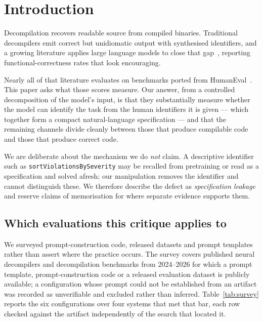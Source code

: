 \documentclass[conference]{IEEEtran}
\begin{document}
\section{Introduction}
Decompilation recovers readable source from compiled binaries. Traditional
decompilers emit correct but unidiomatic output with synthesised identifiers, and
a growing literature applies large language models to close that
gap~\cite{llm4decompile}, reporting functional-correctness rates that look
encouraging.

Nearly all of that literature evaluates on benchmarks ported from
HumanEval~\cite{chen2021evaluating}. This paper asks what those scores measure.
Our answer, from a controlled decomposition of the model's input, is that they
substantially measure whether the model can identify the task from the human
identifiers it is given --- which together form a compact natural-language
specification --- and that the remaining channels divide cleanly between those
that produce compilable code and those that produce correct code.

We are deliberate about the mechanism we do \emph{not} claim. A descriptive
identifier such as \texttt{sortViolationsBySeverity} may be recalled from
pretraining or read as a specification and solved afresh; our manipulation
removes the identifier and cannot distinguish these. We therefore describe the
defect as \emph{specification leakage} and reserve claims of memorisation for
where separate evidence supports them.

\subsection{Which evaluations this critique applies to}
\label{sec:scope}
We surveyed prompt-construction code, released datasets and prompt templates
rather than assert where the practice occurs. The survey covers published neural
decompilers and decompilation benchmarks from 2024--2026 for which a prompt
template, prompt-construction code or a released evaluation dataset is publicly
available; a configuration whose prompt could not be established from an artifact
was recorded as unverifiable and excluded rather than inferred.
Table~\ref{tab:survey} reports the six configurations over four systems that met
that bar, each row checked against the artifact independently of the search that
located it.
\end{document}
